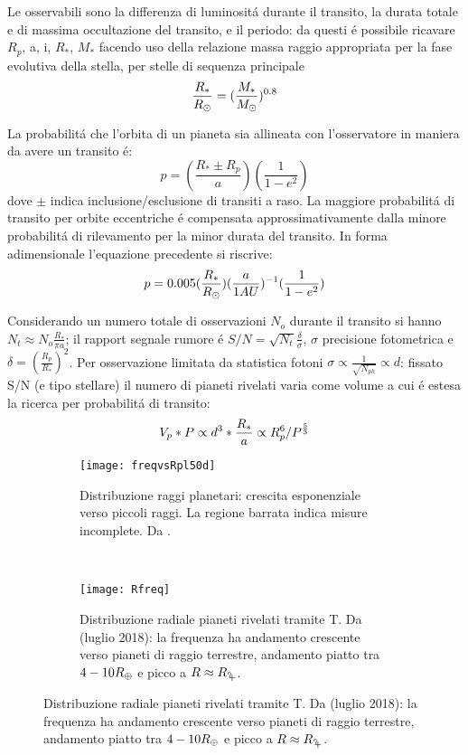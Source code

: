 Le osservabili sono la differenza di luminosit\'a durante il transito, la durata totale e di massima occultazione del transito, e il periodo: da questi \'e possibile ricavare $R_p$, a, i, $R_*$, $M_*$ facendo uso della relazione massa raggio appropriata per la fase evolutiva della stella, per stelle di sequenza principale
\begin{equation}
\frac{R_*}{R_{\odot}{}}=(\frac{M_*}{M_{\odot}{}})^{0.8}
\end{equation}

La probabilit\'a che l'orbita di un pianeta sia allineata con l'osservatore in maniera da avere un transito \'e:
\begin{equation}
p=(\frac{R_*\pm R_p}{a})(\frac{1}{1-e^2})
\end{equation}
dove $\pm$ indica inclusione/esclusione di transiti a raso.
La maggiore probabilit\'a di transito per orbite eccentriche \'e compensata approssimativamente dalla minore probabilit\'a di rilevamento per la minor durata del transito.
In forma adimensionale l'equazione precedente si riscrive:
\begin{equation}
p=0.005(\frac{R_*}{R_{\odot}{}})(\frac{a}{1AU})^{-1}(\frac{1}{1-e^2})
\end{equation}

Considerando un numero totale di osservazioni $N_o$ durante il transito si hanno $N_t\approx N_o\frac{R_*}{\pi a}$; il rapport segnale rumore \'e $S/N=\sqrt{N_t}\frac{\delta}{\sigma}$, $\sigma$ precisione fotometrica e $\delta=(\frac{R_p}{R_*})^2$. Per osservazione limitata da statistica fotoni $\sigma\propto\frac{1}{\sqrt{N_{ph}}}\propto d$: fissato S/N (e tipo stellare) il numero di pianeti rivelati varia come volume a cui \'e estesa la ricerca per probabilit\'a di transito:
\begin{equation}
V_p*P\propto d^3*\frac{R_*}{a}\propto R_p^6/P^{\frac{5}{3}}
\end{equation}

\begin{figure}[!ht]
\begin{subfigure}[b]{0.47\textwidth}
\centering
\texttt{[image: freqvsRpl50d]}
\caption{Distribuzione raggi planetari: crescita esponenziale verso piccoli raggi. La regione barrata indica misure incomplete. Da \cite{howard2012planet}.}\label{fig:howard2012planet}
\end{subfigure}
~
\begin{subfigure}[b]{0.5\textwidth} \centering\texttt{[image: Rfreq]}\caption{Distribuzione radiale pianeti rivelati tramite T. Da \cite{exoplanet.eu} (luglio 2018): la frequenza ha andamento crescente verso pianeti di raggio terrestre, andamento piatto tra $4-10R_{\oplus}{}$ e picco a $R\approx\rjupiter{}$.}\label{fig:probvsR-T}
\end{subfigure}
\end{figure}

